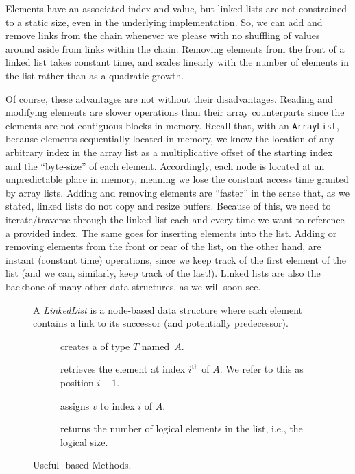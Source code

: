 Elements have an associated index and value, but linked lists are not constrained to a static size, even in the underlying implementation. 
So, we can add and remove links from the chain whenever we please with no shuffling of values around aside from links within the chain. 
Removing elements from the front of a linked list takes constant time, and scales linearly with the number of elements in the list rather than as a quadratic growth.

Of course, these advantages are not without their disadvantages. 
Reading and modifying elements are slower operations than their array counterparts since the elements are not contiguous blocks in memory. 
Recall that, with an \texttt{ArrayList}, because elements sequentially located in memory, we know the location of any arbitrary index in the array list as a multiplicative offset of the starting index and the ``byte-size'' of each element. 
Accordingly, each node is located at an unpredictable place in memory, meaning we lose the constant access time granted by array lists.
Adding and removing elements are ``faster'' in the sense that, as we stated, linked lists do not copy and resize buffers. 
Because of this, we need to iterate/traverse through the linked list each and every time we want to reference a provided index. 
The same goes for inserting elements into the list. 
Adding or removing elements from the front or rear of the list, on the other hand, are instant (constant time) operations, since we keep track of the first element of the list (and we can, similarly, keep track of the last!). 
Linked lists are also the backbone of many other data structures, as we will soon see.

\begin{figure}[tp]
  \small
  \begin{tcolorbox}[title=Java Linked Lists]
    A \emph{LinkedList} is a node-based data structure where each element contains a link to its successor (and potentially predecessor).
    \vspace{2ex}
  \begin{description}
    \item [] creates a  of type $T$ named~$A$.
    \item [] retrieves the element at index $i^{\text{th}}$ of $A$. We refer to this as position $i + 1$. 
    \item [] assigns $v$ to index $i$ of $A$.
    \item [] returns the number of logical elements in the list, i.e., the logical size.
  \end{description}
\end{tcolorbox}
  \caption{Useful -based Methods.}
  \label{fig:linkedlists}
\end{figure}

